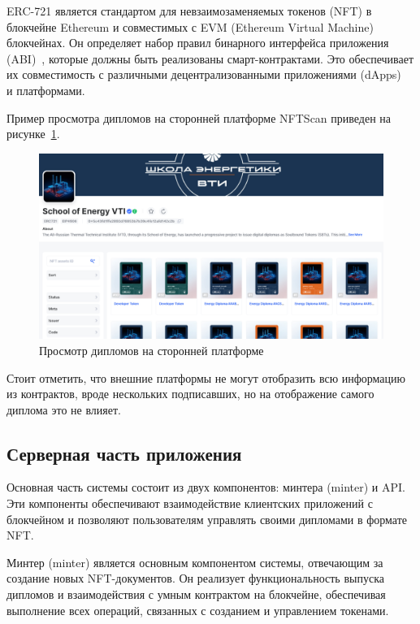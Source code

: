 ERC-721 является стандартом для невзаимозаменяемых токенов (NFT) в блокчейне Ethereum и совместимых с EVM (Ethereum Virtual Machine) блокчейнах. Он определяет набор правил бинарного интерфейса приложения (ABI)~\cite{bib:abi_is}, которые должны быть реализованы смарт-контрактами. Это обеспечивает их совместимость с различными децентрализованными приложениями (dApps)~\cite{bib:dapps} и платформами.

Пример просмотра дипломов на сторонней платформе NFTScan приведен на рисунке~\ref{fig:nftscan}.

\begin{figure}[H]
	\centering
	\includegraphics[width=1\textwidth]{images/3.nftscan.png}
	\parskip=6pt
	\caption{Просмотр дипломов на сторонней платформе}
	\label{fig:nftscan}
\end{figure}

Стоит отметить, что внешние платформы не могут отобразить всю информацию из контрактов, вроде нескольких подписавших, но на отображение самого диплома это не влияет.

\subsection{Серверная часть приложения}

Основная часть системы состоит из двух компонентов: минтера (minter) и API. Эти компоненты обеспечивают взаимодействие клиентских приложений с блокчейном и позволяют пользователям управлять своими дипломами в формате NFT.

Минтер (minter) является основным компонентом системы, отвечающим за создание новых NFT-документов. Он реализует функциональность выпуска дипломов и взаимодействия с умным контрактом на блокчейне, обеспечивая выполнение всех операций, связанных с созданием и управлением токенами.

